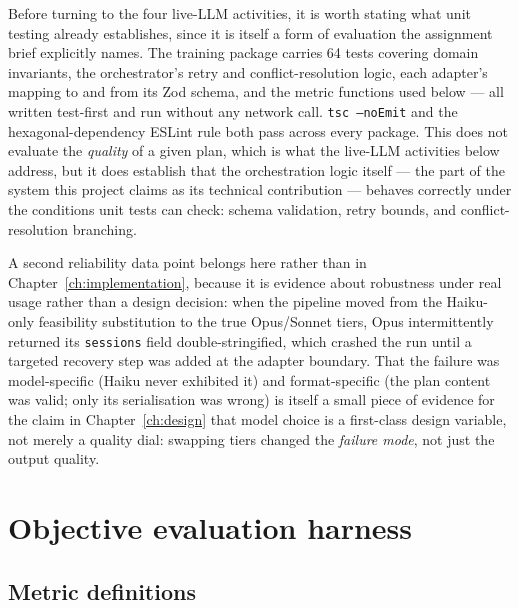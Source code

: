 Before turning to the four live-LLM activities, it is worth stating what unit testing already establishes, since it is itself a form of evaluation the assignment brief explicitly names. The training package carries 64 tests covering domain invariants, the orchestrator's retry and conflict-resolution logic, each adapter's mapping to and from its Zod schema, and the metric functions used below --- all written test-first and run without any network call. \texttt{tsc --noEmit} and the hexagonal-dependency ESLint rule both pass across every package. This does not evaluate the \emph{quality} of a given plan, which is what the live-LLM activities below address, but it does establish that the orchestration logic itself --- the part of the system this project claims as its technical contribution --- behaves correctly under the conditions unit tests can check: schema validation, retry bounds, and conflict-resolution branching.

A second reliability data point belongs here rather than in Chapter~\ref{ch:implementation}, because it is evidence about robustness under real usage rather than a design decision: when the pipeline moved from the Haiku-only feasibility substitution to the true Opus/Sonnet tiers, Opus intermittently returned its \texttt{sessions} field double-stringified, which crashed the run until a targeted recovery step was added at the adapter boundary. That the failure was model-specific (Haiku never exhibited it) and format-specific (the plan content was valid; only its serialisation was wrong) is itself a small piece of evidence for the claim in Chapter~\ref{ch:design} that model choice is a first-class design variable, not merely a quality dial: swapping tiers changed the \emph{failure mode}, not just the output quality.

\section{Objective evaluation harness}
\label{sec:harness}

\subsection{Metric definitions}
\label{sec:metric-defs}

